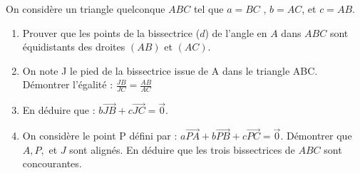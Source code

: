 
On considère un triangle quelconque $ABC$ tel que $a=BC$ , $b=AC$, et $c=AB$.
\begin{enumerate}
\item  Prouver que les points de la bissectrice ($d$) de l'angle en $A$ dans $ABC$ sont équidistants des droites $(AB)$ et $(AC)$.
\item On note J le pied de la bissectrice issue de A dans le triangle ABC.
Démontrer l'égalité : $\frac{JB}{JC}=\frac{AB}{AC}$
\item En déduire que : $b \overrightarrow{JB} + c \overrightarrow{JC} = \vec{0}$. 
\item On considère le point P défini par : $a \overrightarrow{PA} + b \overrightarrow{PB} + c \overrightarrow{PC} = \vec{0}$. 
Démontrer que $A, P,$ et $J$ sont alignés. En déduire que les trois bissectrices de $ABC$ sont concourantes.
\end{enumerate}